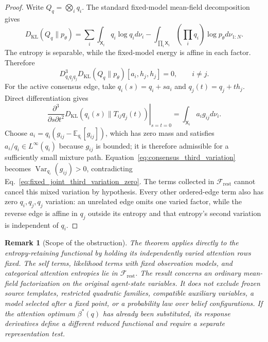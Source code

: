 \documentclass[11pt]{article}
\newtheorem{remark}{Remark}
\begin{document}
\begin{proof}
Write $Q_q=\bigotimes_iq_i$. The standard fixed-model mean-field decomposition~\cite{Wainwright2008} gives
\begin{equation}
D_{\mathrm{KL}}(Q_q\|p_\theta)
=\sum_i\int_{\mathsf{X}_i}q_i\log q_i d\nu_i
-\int_{\prod_i\mathsf{X}_i}\left(\prod_iq_i\right)\log p_\theta d\nu_{1:N}.
\label{eq:fixed_joint_mean_field_structure}
\end{equation}
The entropy is separable, while the fixed-model energy is affine in each factor. Therefore
\begin{equation}
D^3_{q_iq_jq_j}D_{\mathrm{KL}}(Q_q\|p_\theta)[a_i,h_j,h_j]=0,
\qquad i\ne j.
\label{eq:fixed_joint_third_variation_zero}
\end{equation}
For the active consensus edge, take $q_i(s)=q_i+s a_i$ and $q_j(t)=q_j+t h_j$. Direct differentiation gives
\begin{equation}
\left.
\frac{\partial^3}{\partial s\partial t^2}
D_{\mathrm{KL}}(q_i(s)\|T_{ij}q_j(t))
\right|_{s=t=0}
=\int_{\mathsf{X}_i}a_i g_{ij}d\nu_i.
\label{eq:consensus_third_variation}
\end{equation}
Choose $a_i=q_i(g_{ij}-\mathbb{E}_{q_i}[g_{ij}])$, which has zero mass and satisfies $a_i/q_i\in L^\infty(q_i)$ because $g_{ij}$ is bounded; it is therefore admissible for a sufficiently small mixture path. Equation~\eqref{eq:consensus_third_variation} becomes $\operatorname{Var}_{q_i}(g_{ij})>0$, contradicting Eq.~\eqref{eq:fixed_joint_third_variation_zero}. The terms collected in $\mathcal{F}_{\mathrm{rest}}$ cannot cancel this mixed variation by hypothesis. Every other ordered-edge term also has zero $q_i,q_j,q_j$ variation: an unrelated edge omits one varied factor, while the reverse edge is affine in $q_j$ outside its entropy and that entropy's second variation is independent of $q_i$.
\end{proof}

\begin{remark}[Scope of the obstruction]
\label{rem:state_level_elbo_nogo_scope}
The theorem applies directly to the entropy-retaining functional by holding its independently varied attention rows fixed. The self terms, likelihood terms with fixed observation models, and categorical attention entropies lie in $\mathcal{F}_{\mathrm{rest}}$. The result concerns an ordinary mean-field factorization on the original agent-state variables. It does not exclude frozen source templates, restricted quadratic families, compatible auxiliary variables, a model selected after a fixed point, or a probability law over belief configurations. If the attention optimum $\beta^*(q)$ has already been substituted, its response derivatives define a different reduced functional and require a separate representation test.
\end{remark}
\end{document}
